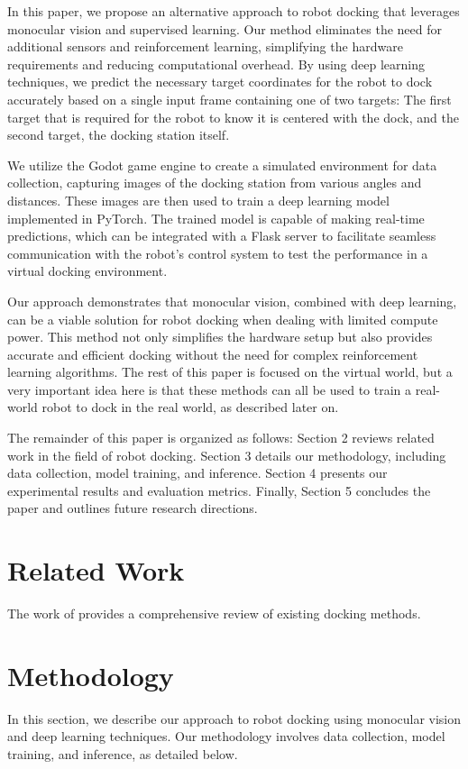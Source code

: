 \documentclass[twocolumn]{article}
\begin{document}
In this paper, we propose an alternative approach to robot docking that leverages monocular vision and supervised learning. Our method eliminates the need for additional sensors and reinforcement learning, simplifying the hardware requirements and reducing computational overhead. By using deep learning techniques, we predict the necessary target coordinates for the robot to dock accurately based on a single input frame containing one of two targets: The first target that is required for the robot to know it is centered with the dock, and the second target, the docking station itself.

We utilize the Godot game engine to create a simulated environment for data collection, capturing images of the docking station from various angles and distances. These images are then used to train a deep learning model implemented in PyTorch. The trained model is capable of making real-time predictions, which can be integrated with a Flask server to facilitate seamless communication with the robot's control system to test the performance in a virtual docking environment.

Our approach demonstrates that monocular vision, combined with deep learning, can be a viable solution for robot docking when dealing with limited compute power. This method not only simplifies the hardware setup but also provides accurate and efficient docking without the need for complex reinforcement learning algorithms. The rest of this paper is focused on the virtual world, but a very important idea here is that these methods can all be used to train a real-world robot to dock in the real world, as described later on.

The remainder of this paper is organized as follows: Section 2 reviews related work in the field of robot docking. Section 3 details our methodology, including data collection, model training, and inference. Section 4 presents our experimental results and evaluation metrics. Finally, Section 5 concludes the paper and outlines future research directions.

\section{Related Work}
The work of \citet{app131910675} provides a comprehensive review of existing docking methods.

\section{Methodology}
In this section, we describe our approach to robot docking using monocular vision and deep learning techniques. Our methodology involves data collection, model training, and inference, as detailed below.
\end{document}
